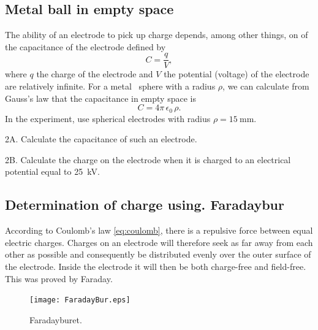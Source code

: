 \documentclass[../Elmag-labhefte-2020.tex]{subfiles}
\begin{document}
\subsection{Metal ball in empty space}

The ability of an electrode to pick up charge depends, among other things, on of the capacitance of the electrode defined by
\begin{equation}
    C = \frac{q}{V},
    \label{eq:coulomb.3.1}
\end{equation}
where $q$ the charge of the electrode and $V$ the potential (voltage) of the electrode are relatively infinite. For a metal \ sphere with a radius $\rho$, we can calculate from Gauss's law that the capacitance in empty space is
\begin{equation}
    C = 4\pi\, \epsilon_0 \, \rho .
    \label{eq:coulomb.3.2}
\end{equation}
%
In the experiment, use spherical electrodes with radius $\rho = \SI{15}{\milli\m}$.

{\itsf 2A. Calculate the capacitance of such an electrode.}

{\itsf 2B. Calculate the charge on the electrode when it is charged to an electrical potential equal to \SI{25}{\kilo\volt}. }

\subsection{Determination of charge using. Faradaybur \label{ch.Faradaybur}}

According to Coulomb's law \eqref{eq:coulomb}, there is a repulsive force between equal electric charges. Charges on an electrode will therefore seek as far away from each other as possible and consequently be distributed evenly over the outer surface of the electrode. Inside the electrode it will then be both charge-free and field-free. This was proved by Faraday.
\begin{figure}[!ht]
    \centering
    \texttt{[image: FaradayBur.eps]}
    \vspace{-5mm}
    \caption{%
        Faradayburet.
    }
    \label{fig:FaradayBur}
    \vspace{-5mm}
\end{figure}
 
\end{document}
